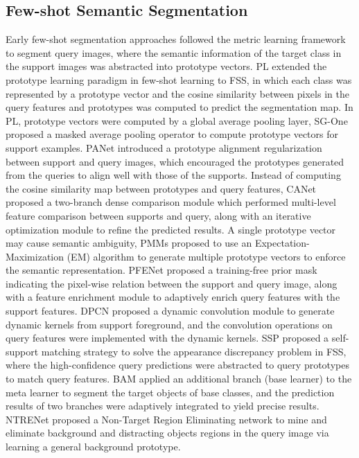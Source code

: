 \documentclass[journal]{IEEEtran}
\begin{document}
\subsection{Few-shot Semantic Segmentation}
Early few-shot segmentation approaches followed the metric learning framework to segment query images, where the semantic information of the target class in the support images was abstracted into prototype vectors. PL\cite{prototypenet} extended the prototype learning paradigm in few-shot learning\cite{prototype} to FSS, in which each class was represented by a prototype vector and the cosine similarity between pixels in the query features and prototypes was computed to predict the segmentation map. In PL, prototype vectors were computed by a global average pooling layer, SG-One\cite{sg-one} proposed a masked average pooling operator to compute prototype vectors for support examples. PANet\cite{panet} introduced a prototype alignment regularization between support and query images, which encouraged the prototypes generated from the queries to align well with those of the supports. Instead of computing the cosine similarity map between prototypes and query features, CANet\cite{canet} proposed a two-branch dense comparison module which performed multi-level feature comparison between supports and query, along with an iterative optimization module to refine the predicted results. A single prototype vector may cause semantic ambiguity, PMMs\cite{pmm} proposed to use an Expectation-Maximization (EM) algorithm to generate multiple prototype vectors to enforce the semantic representation. PFENet\cite{pfenet} proposed a training-free prior mask indicating the pixel-wise relation between the support and query image, along with a feature enrichment module to adaptively enrich query features with the support features. DPCN\cite{dpcn} proposed a dynamic convolution module to generate dynamic kernels from support foreground, and the convolution operations on query features were implemented with the dynamic kernels. SSP\cite{ssp} proposed a self-support matching strategy to solve the appearance discrepancy problem in FSS, where the high-confidence query predictions were abstracted to query prototypes to match query features. BAM\cite{bam} applied an additional branch (base learner) to the meta learner to segment the target objects of base classes, and the prediction results of two branches were adaptively integrated to yield precise results. NTRENet\cite{ntrenet} proposed a Non-Target Region Eliminating network to mine and eliminate background and distracting objects regions in the query image via learning a general background prototype.
\end{document}
